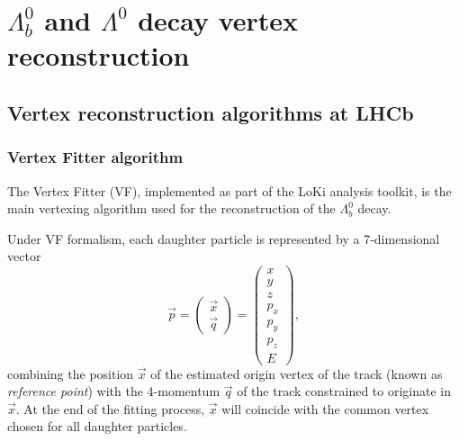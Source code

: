 \chapter{\texorpdfstring{$\Lambda_b^0$}{Lambdab} and \texorpdfstring{$\Lambda^0$}{Lambda} decay vertex reconstruction}
\label{cap:vertex_reconstruction}

\section{Vertex reconstruction algorithms at LHCb}
\subsection{Vertex Fitter algorithm}
The Vertex Fitter (VF), implemented as part of the LoKi analysis toolkit, is the main vertexing algorithm used for the reconstruction of the $\Lambda_b^0$ decay.

Under VF formalism, each daughter particle is represented by a 7-dimensional vector
\begin{equation}
	\vec{p} = \begin{pmatrix}
		\vec{x} \\ \vec{q}
	\end{pmatrix}
	=
	\begin{pmatrix}
		x \\ y \\ z \\ p_x \\ p_y \\ p_z \\ E
	\end{pmatrix},
	\label{eq:particle_representation}
\end{equation}
combining the position $\vec{x}$ of the estimated origin vertex of the track (known as \textit{reference point}) with the 4-momentum $\vec{q}$ of the track constrained to originate in $\vec{x}$.
At the end of the fitting process, $\vec{x}$ will coincide with the common vertex chosen for all daughter particles.

